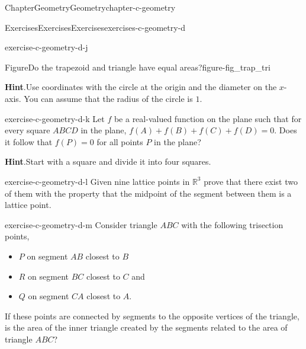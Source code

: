 \documentclass[oneside,10pt,]{book}
\newcommand{\blocktitlefont}{\relax}
\numberwithin{equation}{section}
\begin{document}
\begin{chapterptx}{Chapter}{Geometry}{}{Geometry}{}{}{chapter-c-geometry}
\begin{exercises-section}{Exercises}{Exercises}{}{Exercises}{}{}{exercises-c-geometry-d}
\begin{divisionexercise}{9}{}{}{exercise-c-geometry-d-j}
\begin{figureptx}{Figure}{Do the trapezoid and triangle have equal areas?}{figure-fig_trap_tri}{}
\begin{image}{0.2}{0.6}{0.2}
\end{image}%
\tcblower
\end{figureptx}%
\par\smallskip%
\noindent\textbf{\blocktitlefont Hint}.\hypertarget{hint-c-geometry-d-j-b}{}\quad{}Use coordinates with the circle at the origin and the diameter on the \(x\)-axis.  You can assume that the radius of the circle is \(1\).%
\end{divisionexercise}%
\begin{divisionexercise}{10}{}{}{exercise-c-geometry-d-k}%
Let \(f\) be a real-valued function on the plane such that for every square \(ABCD\) in the plane, \(f(A) + f(B) + f(C) + f(D) = 0\). Does it follow that \(f(P) = 0\) for all points \(P\) in the plane?%
\par\smallskip%
\noindent\textbf{\blocktitlefont Hint}.\hypertarget{hint-c-geometry-d-k-b}{}\quad{}Start with a square and divide it into four squares.%
\end{divisionexercise}%
\begin{divisionexercise}{11}{}{}{exercise-c-geometry-d-l}%
Given nine lattice points in \(\mathbb{R}^3\) prove that there exist two of them with the property that the midpoint of the segment between them is a lattice point.%
\end{divisionexercise}%
\begin{divisionexercise}{12}{}{}{exercise-c-geometry-d-m}%
Consider triangle \(ABC\) with the following trisection points,%
\begin{itemize}[label=\textbullet]
\item{}\(P\) on segment \(AB\) closest to \(B\)%
\item{}\(R\) on segment \(BC\) closest to \(C\) and%
\item{}\(Q\) on segment \(CA\) closest to \(A\).%
\end{itemize}
If these points are connected by segments to the opposite vertices of the triangle, is the area of the inner triangle created by the segments related to the area of triangle \(ABC\)?%
\end{divisionexercise}%
\end{exercises-section}
\end{chapterptx}
%
%
\typeout{************************************************}
\typeout{************************************************}
%
\end{document}
